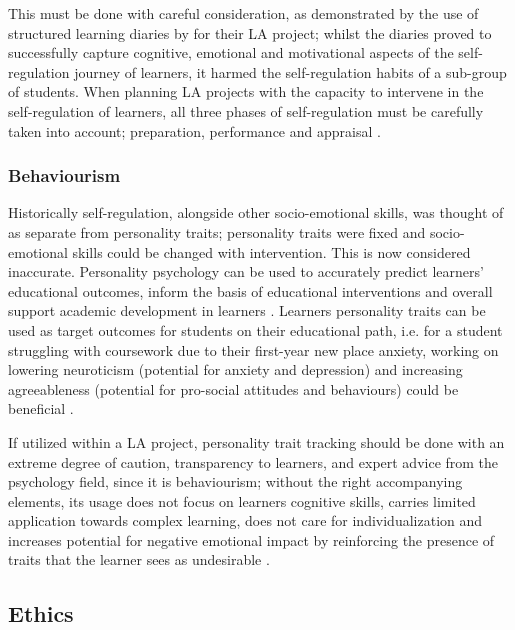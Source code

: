 \documentclass{l4proj}
\begin{document}
This must be done with careful consideration, as demonstrated by the use of structured learning diaries by \citet{MerikkoTechnologicalProcess} for their LA project; whilst the diaries proved to successfully capture cognitive, emotional and motivational aspects of the self-regulation journey of learners, it harmed the self-regulation habits of a sub-group of students. When planning LA projects with the capacity to intervene in the self-regulation of learners, all three phases of self-regulation must be carefully taken into account; preparation, performance and appraisal \citep{Heikkinen123SupportingReview}. 

\subsubsection{Behaviourism}
\hfill

Historically self-regulation, alongside other socio-emotional skills, was thought of as separate from personality traits; personality traits were fixed and socio-emotional skills could be changed with intervention. This is now considered inaccurate. Personality psychology can be used to accurately predict learners' educational outcomes, inform the basis of educational interventions and overall support academic development in learners \citep{Jach123HowResearch}. Learners personality traits can be used as target outcomes for students on their educational path, i.e. for a student struggling with coursework due to their first-year new place anxiety, working on lowering neuroticism (potential for anxiety and depression) and increasing agreeableness (potential for pro-social attitudes and behaviours) could be beneficial \citep{Jach123HowResearch}. 

If utilized within a LA project, personality trait tracking should be done with an extreme degree of caution, transparency to learners, and expert advice from the psychology field, since it is behaviourism; without the right accompanying elements, its usage does not focus on learners cognitive skills, carries limited application towards complex learning, does not care for individualization and increases potential for negative emotional impact by reinforcing the presence of traits that the learner sees as undesirable \citep{Tprestianni_2023}.


 
\subsection{Ethics}
\end{document}
